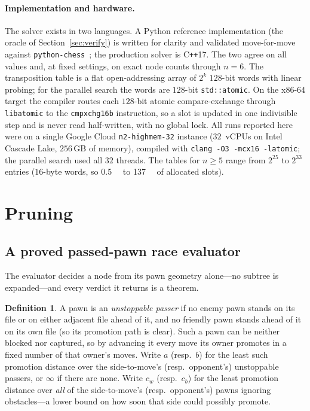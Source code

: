 \documentclass[11pt]{article}
\theoremstyle{plain}
\theoremstyle{definition}
\newtheorem{definition}{Definition}
\begin{document}
\paragraph{Implementation and hardware.} The solver exists in two languages. A
Python reference implementation (the oracle of Section~\ref{sec:verify}) is
written for clarity and validated move-for-move against
\texttt{python-chess}~\cite{pythonchess}; the production solver is C\texttt{++}17. The two agree on all values and, at fixed
settings, on exact node counts through $n=6$. The transposition table is a flat
open-addressing array of $2^{k}$ $128$-bit words with linear probing; for the
parallel search the words are $128$-bit \texttt{std::atomic}. On the x86-64 target
the compiler routes each $128$-bit atomic compare-exchange through
\texttt{libatomic} to the \texttt{cmpxchg16b} instruction, so a slot is updated in
one indivisible step and is never read half-written, with no global lock. All runs
reported here were on a single Google Cloud \texttt{n2-highmem-32} instance
($32$~vCPUs on Intel Cascade Lake, $256$\,GB of memory), compiled with
\texttt{clang -O3 -mcx16 -latomic}; the parallel search used all $32$ threads. The
tables for $n\ge5$ range from $2^{25}$ to $2^{33}$ entries ($16$-byte words, so
\SI{0.5}{\giga\byte} to \SI{137}{\giga\byte} of allocated slots).

\section{Pruning}\label{sec:pruning}

\subsection{A proved passed-pawn race evaluator}\label{sec:race}

The evaluator decides a node from its pawn geometry alone---no subtree is
expanded---and every verdict it returns is a theorem.

\begin{definition}
A pawn is an \emph{unstoppable passer} if no enemy pawn stands on its file or on
either adjacent file ahead of it, and no friendly pawn stands ahead of it on its own
file (so its promotion path is clear). Such a pawn can be neither blocked nor
captured, so by advancing it every move its owner promotes in a fixed number of
that owner's moves. Write $a$ (resp.\ $b$) for the least such promotion distance
over the side-to-move's (resp.\ opponent's) unstoppable passers, or $\infty$ if
there are none. Write $c_w$ (resp.\ $c_b$) for the least promotion distance over
\emph{all} of the side-to-move's (resp.\ opponent's) pawns ignoring obstacles---a
lower bound on how soon that side could possibly promote.
\end{definition}
\end{document}
